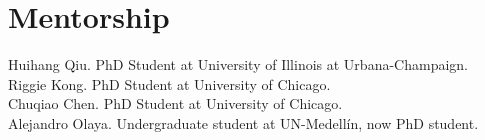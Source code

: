 \documentclass[10pt, singlespace]{article}
\begin{document}
\section{Mentorship}
Huihang Qiu. PhD Student at University of Illinois at Urbana-Champaign.\\
Riggie Kong. PhD Student at University of Chicago.\\
Chuqiao Chen. PhD Student at University of Chicago.\\
Alejandro Olaya. Undergraduate student at UN-Medell\'in, now PhD student.
\label{mylastpage}




\end{document}
